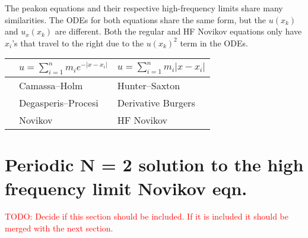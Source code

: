 \documentclass[english,master]{liumaiex}
\theoremstyle{plain}
\theoremstyle{definition}
\newcommand\todo[1]{\textcolor{red}{#1}}
\begin{document}
The peakon equations and their respective high-frequency limits share many similarities. The ODEs for both equations share the same form, but the $u(x_k)$ and $u_x(x_k)$ are different. Both the regular and HF Novikov equations only have $x_i$'s that travel to the right due to the $u(x_k)^2$ term in the ODEs.
\begin{center}
  \begin{tabular}{l|c|c}
    & $u=\sum_{i=1}^n m_i e^{-|x-x_i|}$ & $u=\sum_{i=1}^n m_i |x-x_i|$ \\[3pt]
    \hline
    \makecell[l]{
	$\begin{aligned}
		\dot{x}_i &= u(x_k),\\
		\dot{m}_i &= -\phantom{2}m_i u_x(m_i)
	\end{aligned}$}
	& \multicolumn{1}{l|}{Camassa--Holm} & \multicolumn{1}{l}{Hunter--Saxton} \\
    \hline
    \makecell[l]{
	$\begin{aligned}
		\dot{x}_i &= u(x_k),\\
		\dot{m}_i &= -2m_i u_x(m_i)
	\end{aligned}$}
	& \multicolumn{1}{l|}{Degasperis--Procesi} & \multicolumn{1}{l}{Derivative Burgers} \\
    \hline
    \makecell[l]{
	$\begin{aligned}
		\dot{x}_i &= u(x_k)^2,\\
		\dot{m}_i &= -\phantom{2}m_i u_x(m_i) u(x_i)
	\end{aligned}$}
	& \multicolumn{1}{l|}{Novikov} & \multicolumn{1}{l}{HF Novikov} \\
  \end{tabular}
\end{center}


\section{Periodic N = 2 solution to the high frequency limit Novikov eqn.}

\todo{TODO: Decide if this section should be included. If it is included it should be merged with the next section.}
\end{document}
